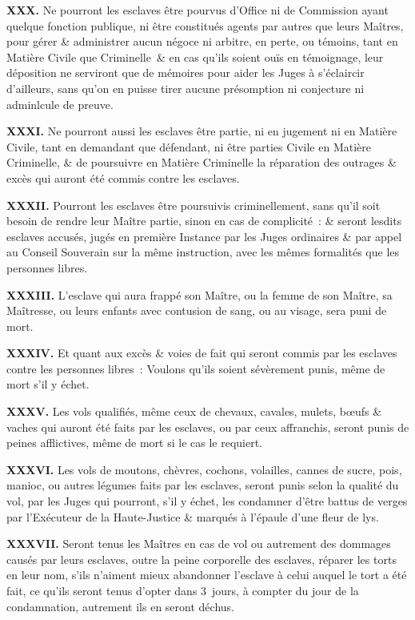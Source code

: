 \documentclass[twoside]{book} %
\newcommand{\labelchar}[1]{\textbf{\color{rubric} #1}}
\begin{document}
\labelchar{XXX.} Ne pourront les esclaves être pourvus d’Office ni de Commission ayant quelque fonction publique, ni être constitués agents par autres que leurs Maîtres, pour gérer \& administrer aucun négoce ni arbitre, en perte, ou témoins, tant en Matière Civile que Criminelle \& en cas qu’ils soient ouïs en témoignage, leur déposition ne serviront que de mémoires pour aider les Juges à s’éclaircir d’ailleurs, sans qu’on en puisse tirer aucune présomption ni conjecture ni adminlcule de preuve.\par
\labelchar{XXXI.} Ne pourront aussi les esclaves être partie, ni en jugement ni en Matière Civile, tant en demandant que défendant, ni être parties Civile en Matière Criminelle, \& de poursuivre en Matière Criminelle la réparation des outrages \& excès qui auront été commis contre les esclaves.\par
\labelchar{XXXII.} Pourront les esclaves être poursuivis criminellement, sans qu’il soit besoin de rendre leur Maître partie, sinon en cas de complicité : \& seront lesdits esclaves accusés, jugés en première Instance par les Juges ordinaires \& par appel au Conseil Souverain sur la même instruction, avec les mêmes formalités que les personnes libres.\par
\labelchar{XXXIII.} L’esclave qui aura frappé son Maître, ou la femme de son Maître, sa Maîtresse, ou leurs enfants avec contusion de sang, ou au visage, sera puni de mort.\par
\labelchar{XXXIV.} Et quant aux excès \& voies de fait qui seront commis par les esclaves contre les personnes libres : Voulons qu’ils soient sévèrement punis, même de mort s’il y échet.\par
\labelchar{XXXV.} Les vols qualifiés, même ceux de chevaux, cavales, mulets, bœufs \& vaches qui auront été faits par les esclaves, ou par ceux affranchis, seront punis de peines afflictives, même de mort si le cas le requiert.\par
\labelchar{XXXVI.} Les vols de moutons, chèvres, cochons, volailles, cannes de sucre, pois, manioc, ou autres légumes faits par les esclaves, seront punis selon la qualité du vol, par les Juges qui pourront, s’il y échet, les condamner d’être battus de verges par l’Exécuteur de la Haute-Justice \& marqués à l’épaule d’une fleur de lys.\par
\labelchar{XXXVII.} Seront tenus les Maîtres en cas de vol ou autrement des dommages causés par leurs esclaves, outre la peine corporelle des esclaves, réparer les torts en leur nom, s’ils n’aiment mieux abandonner l’esclave à celui auquel le tort a été fait, ce qu’ils seront tenus d’opter dans 3 jours, à compter du jour de la condamnation, autrement ils en seront déchus.\par
\end{document}
